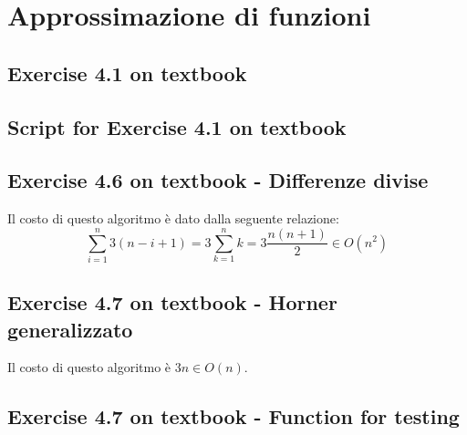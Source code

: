 \section{Approssimazione di funzioni}

\subsection{Exercise 4.1 on textbook}
\label{subsec:exercise41}
 

\subsection{Script for Exercise 4.1 on textbook}
\label{subsec:scriptForExercise41}


\subsection{Exercise 4.6 on textbook - Differenze divise}
\label{subsec:differenzeDiviseEngineCode}

Il costo di questo algoritmo \`e dato dalla seguente relazione:
\begin{displaymath}
\sum_{i = 1}^{n}{3(n-i+1)} = 3\sum_{k = 1}^{n}{k} = 3\frac{n(n+1)}{2} \in
O(n^{2})
\end{displaymath}

\subsection{Exercise 4.7 on textbook - Horner generalizzato}
\label{subsec:HornerGeneralizzato}
  
Il costo di questo algoritmo \`e $3n \in O(n)$.

\subsection{Exercise 4.7 on textbook - Function for testing}
\label{subsec:exercise47testing}
 